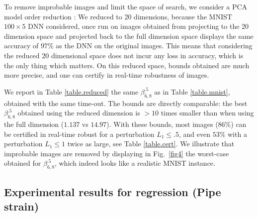 To remove improbable images and limit the space of search, 
we consider a PCA model order reduction \cite{Paco}: We reduced to 20 dimensions, because the MNIST $100 \times 5$ DNN considered, once run on images obtained from projecting to the 20 dimension space and projected back to the full dimension space displays the same accuracy of $97$\% as the DNN on the original images. This means that considering the reduced 20 dimensional space
does not incur any loss in accuracy, which is the only thing which matters. On this reduced space, bounds obtained are much more precise, and one can certify in real-time robustness of images.





We report in Table \ref{table.reduced} the same $\beta^{.5}_{6,8}$
as in Table \ref{table.mnist}, obtained with the same time-out. The bounds are directly comparable: the best $\beta^{.5}_{6,8}$ obtained using the reduced dimension is $>10$ times smaller than when using the full dimension ($1.137$ vs $14.97$). 
With these bounds, most images ($86\%$) can be certified in real-time robust for a perturbation $L_1 \leq .5$, and even $53\%$ with a perturbation $L_1 \leq 1$ twice as large, see Table \ref{table.cert}. We illustrate that improbable images are removed by displaying in Fig.~\ref{fig4} the worst-case obtained for $\beta^{.5}_{6,8}$, which indeed looks like a realistic MNIST instance.




	
	


	


\subsection{Experimental results for regression (Pipe strain)}



